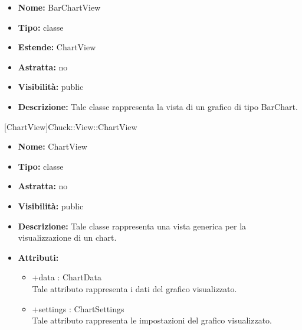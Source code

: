 			
			\begin{itemize}
			\item \textbf{Nome:} BarChartView
			\item \textbf{Tipo:} classe
			
		\item \textbf{Estende:}
		ChartView
		\item \textbf{Astratta:}
		no
			\item \textbf{Visibilità:} public
			\item \textbf{Descrizione:} Tale classe rappresenta la vista di un grafico di tipo BarChart.
			\end{itemize}

			
			[ChartView]{Chuck::View::ChartView}
			

	
			
			\begin{itemize}
			\item \textbf{Nome:} ChartView
			\item \textbf{Tipo:} classe
			
		\item \textbf{Astratta:}
		no
			\item \textbf{Visibilità:} public
			\item \textbf{Descrizione:} Tale classe rappresenta una vista generica per la visualizzazione di un chart.
			\item \textbf{Attributi:}
				\begin{itemize}
				\setlength{\itemsep}{5pt}
				
					\item[\ding{111}] {+data : ChartData} \\ [1mm] Tale attributo rappresenta i dati del grafico visualizzato.
					\item[\ding{111}] {+settings : ChartSettings} \\ [1mm] Tale attributo rappresenta le impostazioni del grafico visualizzato.
				\end{itemize}
		
			\end{itemize}

